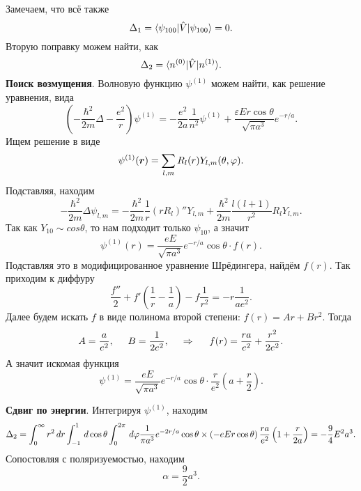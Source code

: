 Замечаем, что всё также
\begin{equation*}
    \Delta_1  = \bk{\psi_{100}}[\hat{V}]{\psi_{100}} = 0.
\end{equation*}
Вторую поправку можем найти, как
\begin{equation*}
    \Delta_2 = \bk{n^{(0)}}[\hat{V}]{n^{(1)}}.
\end{equation*}
\textbf{Поиск возмущения}. Волновую функцию $\psi^{(1)}$ можем найти, как решение уравнения, вида
\begin{equation*}
    \left(
        - \frac{\hbar^2}{2m} \Delta - \frac{e^2}{r}
    \right) \psi^{(1)} = - \frac{e^2}{2 a} \frac{1}{n^2} \psi^{(1)} + \frac{\varepsilon E r \cos \theta}{\sqrt{\pi a^3}} e^{-r/a}.
\end{equation*}
Ищем решение в виде
\begin{equation*}
    \psi^{(1)} (\mbox{\boldmath $r$}) = \sum_{l,m} R_l (r) Y_{l,m} (\theta, \varphi).
\end{equation*}
Подставляя, находим
\begin{equation*}
    - \frac{\hbar^2}{2 m} \Delta \psi_{l,m} = - \frac{\hbar^2}{2m } \frac{1}{r} (r R_l)'' Y_{l,m} + \frac{\hbar^2}{2m} \frac{l (l+1)}{r^2} R_l Y_{l,m}.
\end{equation*}
Так как $Y_{10} \sim cos \theta$, то нам подходит только $\psi_{10}$, а значит
\begin{equation*}
    \psi^{(1)} (r) = \frac{e E}{\sqrt{\pi a^3}} e^{-r/a} \cos \theta \cdot f(r).
\end{equation*}
Подставляя это в модифицированное уравнение Шрёдингера, найдём $f(r)$. Так приходим к диффуру
\begin{equation*}
    \frac{f''}{2} + f'\left(\frac{1}{r}-\frac{1}{a}\right) - f \frac{1}{r^2} = - r \frac{1}{a e^2}.
\end{equation*}
Далее будем искать $f$ в виде полинома второй степени: $f(r) = A r + B r^2$. Тогда
\begin{equation*}
    A = \frac{a}{e^2},
    \hspace{5 mm} 
    B = \frac{1}{2 e^2},
    \hspace{0.5cm} \Rightarrow \hspace{0.5cm}
    f(r) = \frac{r a}{e^2} + \frac{r^2}{2 e^2}.
\end{equation*}
А значит искомая функция
\begin{equation*}
    \psi^{(1)} = \frac{e E}{\sqrt{\pi a^3}} e^{-r/a} \cos \theta \cdot \frac{r}{e^2} \left(a + \frac{r}{2}\right).
\end{equation*}

\textbf{Сдвиг по энергии}. Интегрируя $\psi^{(1)}$, находим
\begin{equation*}
    \Delta_2 = \int_{0}^{\infty} r^2 \, d r \int_{-1}^{1} \, d \cos \theta \int_{0}^{2 \pi} \, d \varphi \frac{1}{\pi a^3} e^{-2r/a} \cos \theta \times 
    \left(- e E r \cos \theta\right) \frac{r a}{e^2} \left(1 + \frac{r}{2a}\right) = - \frac{9}{4}  E^2 a^3.
\end{equation*}
Сопостовляя с поляризуемостью, находим
\begin{equation*}
    \alpha = \frac{9}{2} a^3.
\end{equation*}
